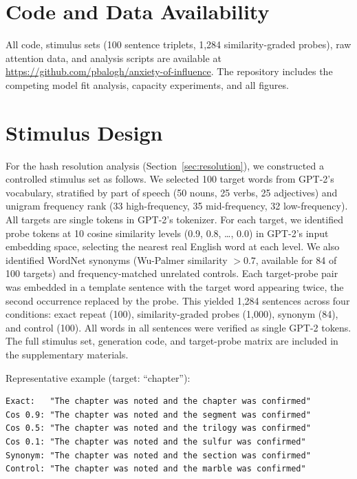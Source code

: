 \documentclass[11pt]{article}
\begin{document}
\section*{Code and Data Availability}

All code, stimulus sets (100 sentence triplets, 1,284 similarity-graded probes), raw attention data, and analysis scripts are available at \url{https://github.com/pbalogh/anxiety-of-influence}. The repository includes the competing model fit analysis, capacity experiments, and all figures.




\newpage
\appendix
\section{Stimulus Design}
\label{app:stimuli}

For the hash resolution analysis (Section~\ref{sec:resolution}), we constructed a controlled stimulus set as follows. We selected 100 target words from GPT-2's vocabulary, stratified by part of speech (50 nouns, 25 verbs, 25 adjectives) and unigram frequency rank (33 high-frequency, 35 mid-frequency, 32 low-frequency). All targets are single tokens in GPT-2's tokenizer. For each target, we identified probe tokens at 10 cosine similarity levels (0.9, 0.8, \ldots, 0.0) in GPT-2's input embedding space, selecting the nearest real English word at each level. We also identified WordNet synonyms (Wu-Palmer similarity $> 0.7$, available for 84 of 100 targets) and frequency-matched unrelated controls. Each target-probe pair was embedded in a template sentence with the target word appearing twice, the second occurrence replaced by the probe. This yielded 1,284 sentences across four conditions: exact repeat (100), similarity-graded probes (1,000), synonym (84), and control (100). All words in all sentences were verified as single GPT-2 tokens. The full stimulus set, generation code, and target-probe matrix are included in the supplementary materials.

Representative example (target: ``chapter''):
\begin{small}
\begin{verbatim}
Exact:   "The chapter was noted and the chapter was confirmed"
Cos 0.9: "The chapter was noted and the segment was confirmed"
Cos 0.5: "The chapter was noted and the trilogy was confirmed"
Cos 0.1: "The chapter was noted and the sulfur was confirmed"
Synonym: "The chapter was noted and the section was confirmed"
Control: "The chapter was noted and the marble was confirmed"
\end{verbatim}
\end{small}
\end{document}
